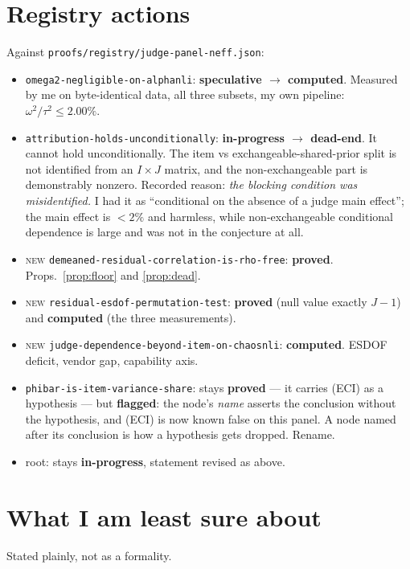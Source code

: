 \documentclass[11pt]{article}
\theoremstyle{definition}
\begin{document}
\section{Registry actions}

Against \texttt{proofs/registry/judge-panel-neff.json}:

\begin{itemize}
\item \texttt{omega2-negligible-on-alphanli}: \textbf{speculative $\to$ computed}.
Measured by me on byte-identical data, all three subsets, my own pipeline:
$\omega^2/\tau^2\le2.00\%$.
\item \texttt{attribution-holds-unconditionally}: \textbf{in-progress $\to$
dead-end}. It cannot hold unconditionally. The item vs exchangeable-shared-prior
split is not identified from an $I\times J$ matrix, and the non-exchangeable part is
demonstrably nonzero. Recorded reason: \emph{the blocking condition was
misidentified.} I had it as ``conditional on the absence of a judge main effect'';
the main effect is $<2\%$ and harmless, while non-exchangeable conditional
dependence is large and was not in the conjecture at all.
\item \textsc{new} \texttt{demeaned-residual-correlation-is-rho-free}:
\textbf{proved}. Props.~\ref{prop:floor} and \ref{prop:dead}.
\item \textsc{new} \texttt{residual-esdof-permutation-test}: \textbf{proved} (null
value exactly $J-1$) and \textbf{computed} (the three measurements).
\item \textsc{new} \texttt{judge-dependence-beyond-item-on-chaosnli}:
\textbf{computed}. ESDOF deficit, vendor gap, capability axis.
\item \texttt{phibar-is-item-variance-share}: stays \textbf{proved} --- it carries
(ECI) as a hypothesis --- but \textbf{flagged}: the node's \emph{name} asserts the
conclusion without the hypothesis, and (ECI) is now known false on this panel. A
node named after its conclusion is how a hypothesis gets dropped. Rename.
\item root: stays \textbf{in-progress}, statement revised as above.
\end{itemize}

\section{What I am least sure about}

Stated plainly, not as a formality.
\end{document}
